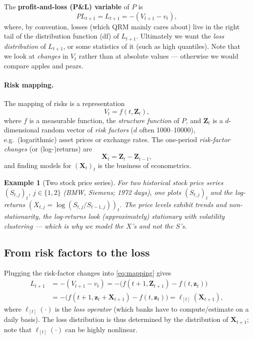\documentclass[11pt,a4paper]{article}
\newtheorem{example}{Example}
\begin{document}
The \textbf{profit-and-loss (P\&L) variable} of $P$ is
\begin{equation}\label{eq:PL}
  PL_{t+1}=L_{t+1}=-(V_{t+1}-v_t),
\end{equation}
where, by convention, losses (which QRM mainly cares about) live in the right tail of the
distribution function (df) of $L_{t+1}$. Ultimately we want the \emph{loss distribution} of
$L_{t+1}$, or some statistics of it (such as high quantiles). Note that we look at \emph{changes} in
$V_t$ rather than at absolute values --- otherwise we would compare apples and pears.

\paragraph{Risk mapping.} The mapping of risks is a representation
\begin{equation}\label{eq:mapping}
  V_t=f(t,\mathbf{Z}_t),
\end{equation}
where $f$ is a measurable function, the \emph{structure function} of $P$, and $\mathbf{Z}_t$ is a
$d$-dimensional random vector of \emph{risk factors} ($d$ often 1000--10000), e.g.\ (logarithmic)
asset prices or exchange rates. The one-period \emph{risk-factor changes} (or (log-)returns) are
\[
  \mathbf{X}_t=\mathbf{Z}_t-\mathbf{Z}_{t-1},
\]
and finding models for $(\mathbf{X}_t)_t$ is the business of econometrics.

\begin{example}[Two stock price series]
For two historical stock price series $(S_{t,j})_{t}$, $j\in\{1,2\}$ (BMW, Siemens; 1972 days), one
plots $(S_{t,j})_t$ and the log-returns $(X_{t,j}=\log(S_{t,j}/S_{t-1,j}))_t$. The price levels
exhibit trends and non-stationarity, the log-returns look (approximately) stationary with
volatility clustering --- which is why we model the $X$'s and not the $S$'s.
\end{example}

\subsection{From risk factors to the loss}
Plugging the risk-factor changes into \eqref{eq:mapping} gives
\begin{equation}\label{eq:losscalc}
  \begin{aligned}
    L_{t+1}&=-(V_{t+1}-v_t)=-\big(f(t+1,\mathbf{Z}_{t+1})-f(t,\mathbf{z}_t)\big)\\
            &=-\big(f(t+1,\mathbf{z}_t+\mathbf{X}_{t+1})-f(t,\mathbf{z}_t)\big)
             =\ell_{[t]}(\mathbf{X}_{t+1}),
  \end{aligned}
\end{equation}
where $\ell_{[t]}(\cdot)$ is the \emph{loss operator} (which banks have to compute/estimate on a
daily basis). The loss distribution is thus determined by the distribution of $\mathbf{X}_{t+1}$;
note that $\ell_{[t]}(\cdot)$ can be highly nonlinear.
\end{document}
